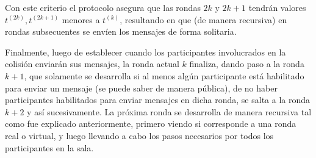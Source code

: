 Con este criterio el protocolo asegura que las rondas $2k$ y $2k + 1$ tendrán valores 
$t^{(2k)}, t^{(2k + 1)}$ menores a $t^{(k)}$, resultando en que (de manera recursiva) en rondas 
subsecuentes se envíen los mensajes de forma solitaria.

Finalmente, luego de establecer cuando los participantes involucrados en la colisión enviarán 
sus mensajes, la ronda actual $k$ finaliza, dando paso a la ronda $k+1$, que solamente se 
desarrolla si al menos algún participante está habilitado para enviar un mensaje (se puede 
saber de manera pública), de no haber participantes habilitados para enviar mensajes en dicha 
ronda, se salta a la ronda $k+2$ y así sucesivamente. La próxima ronda se desarrolla de manera 
recursiva tal como fue explicado anteriormente, primero viendo si corresponde a una ronda real 
o virtual, y luego llevando a cabo los pasos necesarios por todos los participantes en la sala.